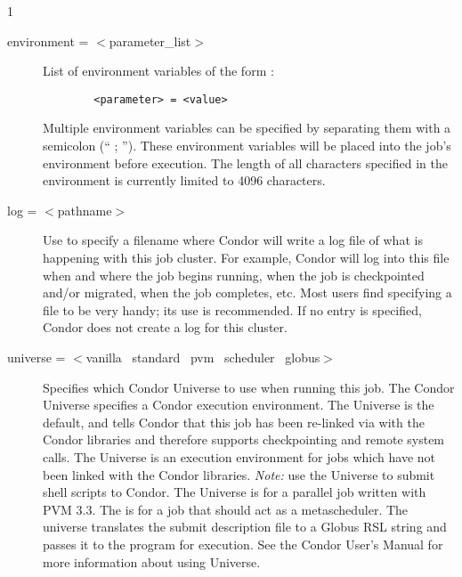 \begin{ManPage}{\label{man-condor-submit}}{1}
\begin{description}

\item[environment = $<$parameter\_list$>$] List of environment variables
of the form :
\begin{verbatim}
        <parameter> = <value>
\end{verbatim}
Multiple environment variables can be specified by separating them with a
semicolon (`` ; ''). These environment variables will be placed into the
job's environment before execution. The length of all characters
specified in the environment is currently limited to 4096 characters. 


\item[log = $<$pathname$>$] Use  to specify a filename where
Condor will write a log file of what is happening with this job cluster.
For example, Condor will log into this file when and where the job
begins running, when the job is checkpointed and/or migrated, when the
job completes, etc. Most users find specifying a  file to be very
handy; its use is recommended. If no  entry is specified, 
Condor does not create a log for this cluster.


\item[universe = $<$vanilla \Bar\ standard \Bar\ pvm \Bar\ scheduler \Bar\ globus$>$] 
Specifies which Condor Universe to use when running this job.  The Condor 
Universe specifies a Condor execution environment.  The  
Universe is the default, and tells Condor that this job has been re-linked 
via  with the Condor libraries and therefore supports
checkpointing and remote system calls.  The  Universe is an
execution environment for jobs which have not been linked with the
Condor libraries.  \textit{Note:} use the  Universe to
submit shell scripts to Condor.  The  Universe is for a
parallel job written with PVM 3.3. The  is for a job that
should act as a metascheduler. The  universe translates the
submit description file to a Globus RSL string and passes it to 
the  program for execution. 
See the Condor User's Manual for more information about using Universe.



\end{description}
\end{ManPage}
